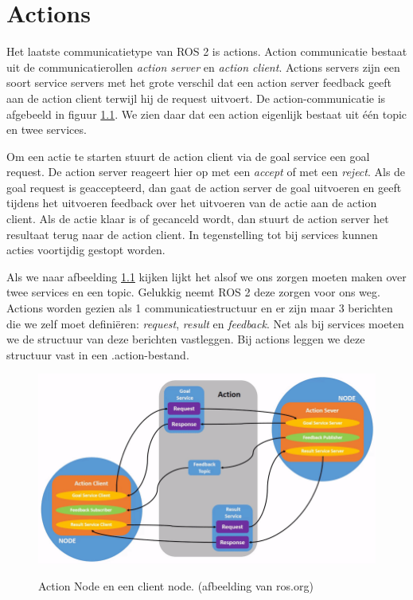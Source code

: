 \chapter{Actions}
\label{chp:actions}
Het laatste communicatietype van ROS 2 is actions. Action communicatie bestaat uit de communicatierollen \textit{action server} en \textit{action client}. Actions servers zijn een soort service servers met het grote verschil dat een action server feedback geeft aan de action client terwijl hij de request uitvoert. De action-communicatie is afgebeeld in figuur \ref{fig:action_node}. We zien daar dat een action eigenlijk bestaat uit \'e\'en topic en twee services.

Om een actie te starten stuurt de action client via de goal service een goal request. De action server reageert hier op met een \textit{accept} of met een \textit{reject}. Als de goal request is geaccepteerd, dan gaat de action server de goal uitvoeren en geeft tijdens het uitvoeren feedback over het uitvoeren van de actie aan de action client. Als de actie klaar is of gecanceld wordt, dan stuurt de action server het resultaat terug naar de action client. In tegenstelling tot bij services kunnen acties voortijdig gestopt worden. 

Als we naar afbeelding \ref{fig:action_node} kijken lijkt het alsof we ons zorgen moeten maken over twee services en een topic. Gelukkig neemt ROS 2 deze zorgen voor ons weg. Actions worden gezien als 1 communicatiestructuur en er zijn maar 3 berichten die we zelf moet definiëren: \textit{request}, \textit{result} en \textit{feedback}. Net als bij services moeten we de structuur van deze berichten vastleggen.  Bij actions leggen we deze structuur vast in een .action-bestand.

\begin{figure}[ht]
\begin{center}
\includegraphics[scale=0.7]{Pictures/Action-SingleActionClient.png}\\
\end{center}
\caption{Action Node en een client node. {\tiny (afbeelding van ros.org\cite{ROSactionserver})}}\label{fig:action_node}
\end{figure}


